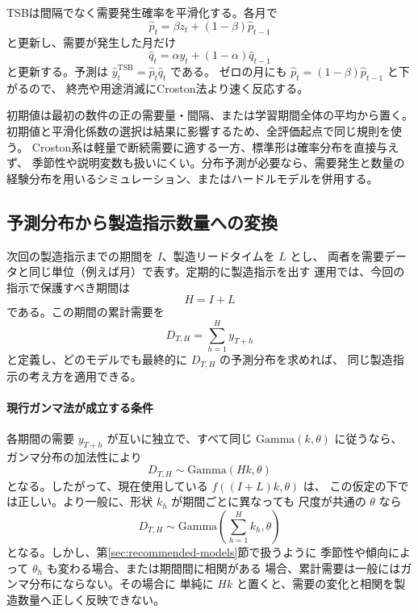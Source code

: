 \documentclass[a4paper,11pt]{jsarticle}
\begin{document}
TSBは間隔でなく需要発生確率を平滑化する。各月で
\[
\hat p_t=\beta z_t+(1-\beta)\hat p_{t-1}
\]
と更新し、需要が発生した月だけ
\[
\hat q_t=\alpha y_t+(1-\alpha)\hat q_{t-1}
\]
と更新する。予測は $\hat y_t^{\mathrm{TSB}}=\hat p_t\hat q_t$ である。
ゼロの月にも $\hat p_t=(1-\beta)\hat p_{t-1}$ と下がるので、
終売や用途消滅にCroston法より速く反応する。

初期値は最初の数件の正の需要量・間隔、または学習期間全体の平均から置く。
初期値と平滑化係数の選択は結果に影響するため、全評価起点で同じ規則を使う。
Croston系は軽量で断続需要に適する一方、標準形は確率分布を直接与えず、
季節性や説明変数も扱いにくい。分布予測が必要なら、需要発生と数量の
経験分布を用いるシミュレーション、またはハードルモデルを併用する。

\subsection{予測分布から製造指示数量への変換}
\label{sec:production-quantity}

次回の製造指示までの期間を $I$、製造リードタイムを $L$ とし、
両者を需要データと同じ単位（例えば月）で表す。定期的に製造指示を出す
運用では、今回の指示で保護すべき期間は
\[
H=I+L
\]
である。この期間の累計需要を
\[
D_{T,H}=\sum_{h=1}^{H}y_{T+h}
\]
と定義し、どのモデルでも最終的に $D_{T,H}$ の予測分布を求めれば、
同じ製造指示の考え方を適用できる。

\paragraph{現行ガンマ法が成立する条件}
各期間の需要 $y_{T+h}$ が互いに独立で、すべて同じ
$\mathrm{Gamma}(k,\theta)$ に従うなら、ガンマ分布の加法性により
\[
D_{T,H}\sim\mathrm{Gamma}(Hk,\theta)
\]
となる。したがって、現在使用している $f((I+L)k,\theta)$ は、
この仮定の下では正しい。より一般に、形状 $k_h$ が期間ごとに異なっても
尺度が共通の $\theta$ なら
\[
D_{T,H}\sim\mathrm{Gamma}\left(\sum_{h=1}^{H}k_h,\theta\right)
\]
となる。しかし、第\ref{sec:recommended-models}節で扱うように
季節性や傾向によって $\theta_h$ も変わる場合、または期間間に相関がある
場合、累計需要は一般にはガンマ分布にならない。その場合に
単純に $Hk$ と置くと、需要の変化と相関を製造数量へ正しく反映できない。
\end{document}
